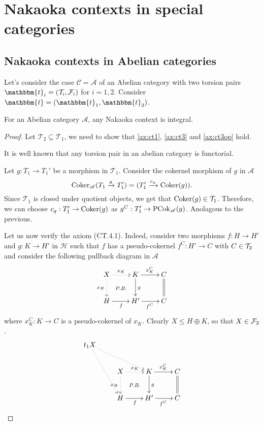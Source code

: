 













\section{Nakaoka contexts in special categories}
\subsection{Nakaoka contexts in Abelian categories}

Let's consider the case $\mathscr{C}=\mathscr{A}$ of an Abelian category with
two torsion pairs $\mathbbm{t}_i=(\mathcal{T}_i,\mathcal{F}_i)$ for $i=1,2$.
Consider $\mathbbm{t}=(\mathbbm{t}_1,\mathbbm{t}_2)$.

\begin{lemma}\label{rmk:2.2}
For an Abelian category $\mathscr{A}$, any Nakaoka context is integral.
\end{lemma}
\begin{proof}
  Let $\mathcal{T}_2\subseteq\mathcal{T}_1$, we need to show that \ref{ax:ct1},
  \ref{ax:ct3} and \ref{ax:ct3op} hold.
  \begin{torsionaxioms}
    \item It is well known that any torsion pair in an abelian category is functorial.
    \setcounter{enumi}{2}
    \item Let $g:T_1\to T_1'$ be a morphism in $\mathcal{T}_1$. Consider the cokernel morphism
    of $g$ in $\mathscr{A}$
    \begin{equation*}
      \operatorname{Coker}_\mathscr{A}(T_1\xrightarrow{g}T_1')=(T_1'\xrightarrow{c_g}\operatorname{Coker}(g)).
    \end{equation*}
    Since $\mathcal{T}_1$ is closed under quotient objects, we get that $\operatorname{Coker}(g)\in\mathcal{T}_1$.
    Therefore, we can choose $c_g:T_1'\to\operatorname{Coker}(g)$ as $g^C:T_1'\to\operatorname{PCok}_\mathscr{A}(g)$.
    \varitem{^\ast} Anolagous to the previous.
  \end{torsionaxioms}

\bigskip\bigskip
Let us now verify the axiom (CT.4.1). Indeed, consider two morphisms $f\colon H\to H'$ and $g\colon K\to H'$ in $\mathcal{H}$ such that $f$ has a pseudo-cokernel $f^C\colon H'\to C$ with $C\in \mathcal{T}_2$ and consider the following pullback diagram in $\mathscr{A}$
\[
\xymatrix{
X\ar@{}[dr]|{P.B.}\ar@{.>}[d]_{x_H}\ar@{.>}[r]^{x_K}&K\ar[r]^{x_K^C}\ar[d]^{g}&C\ar@{=}[d]\\
H\ar[r]_f&H'\ar[r]_{f^C}&C
}
\]
where $x_K^C\colon K\to C$ is a pseudo-cokernel of $x_K$. Clearly $X\leq H\oplus K$, so that $X\in \mathcal{F}_2$.
\[
\xymatrix{
t_1X\ar@{.>}[rrd]\ar@{.>}[ddr]\\
&X\ar@{}[dr]|{P.B.}\ar@{.>}[d]_{x_H}\ar@{.>}[r]^{x_K}&K\ar[r]^{x_K^C}\ar[d]^{g}&C\ar@{=}[d]\\
&H\ar[r]_f&H'\ar[r]_{f^C}&C
}
\]
\end{proof}

